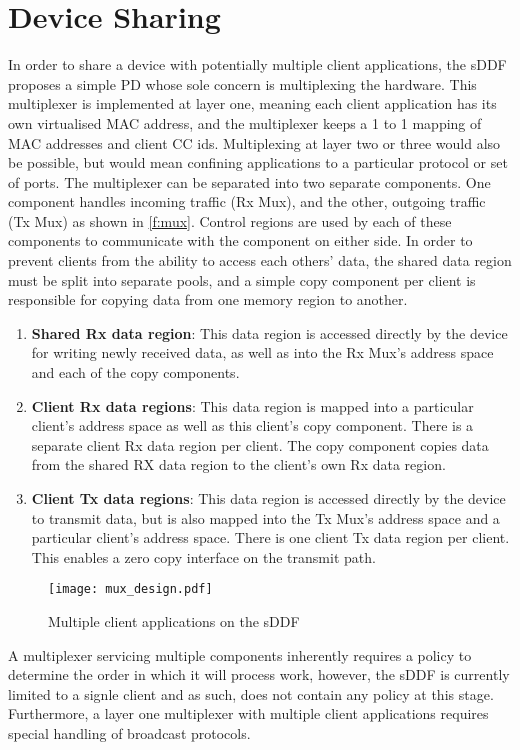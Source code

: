 \section{Device Sharing}\label{s:mux_design}
In order to share a device with potentially multiple client applications, the sDDF proposes a simple PD whose 
sole concern is multiplexing the hardware. This multiplexer is implemented at layer one, meaning each client application has its
own virtualised MAC address, and the multiplexer keeps a 1 to 1 mapping of MAC addresses and client CC ids. Multiplexing at layer two
or three would also be possible, but would mean confining applications to a particular protocol or set of ports. 
The multiplexer
can be separated into two separate components. One component handles incoming traffic (Rx Mux), and the other, outgoing traffic
(Tx Mux) as shown in \autoref{f:mux}. Control regions are used by each of these components to communicate with the component on 
either side.
In order to prevent clients from the ability to access each others' data, the shared data region must be split into
separate pools, and a simple copy component per client is responsible for copying data from one memory region to another.
\begin{enumerate}
\item \textbf{Shared Rx data region}: This data region is accessed directly by the device for writing newly received data, as well
as into the Rx Mux's address space and each of the copy components.
\item \textbf{Client Rx data regions}: This data region is mapped into a particular client's address space as well as this
client's copy component. There is a separate client Rx data region per client. The copy component copies data from the 
shared RX data region to the client's own Rx data region.
\item \textbf{Client Tx data regions}: This data region is accessed directly by the device to transmit data, but is also mapped into
the Tx Mux's address space and a particular client's address space. There is one client Tx data region per client. This
enables a zero copy interface on the transmit path.
\end{enumerate}

\begin{figure}[h]
    \centering
    \texttt{[image: mux\_design.pdf]}
    \caption{Multiple client applications on the sDDF}
    \label{f:mux}
\end{figure}

A multiplexer servicing multiple components inherently requires a policy to determine the order in which it will process work,
however, the sDDF is currently limited to a signle client and as such, does not contain any policy at this stage. Furthermore,
a layer one multiplexer with multiple client applications requires special handling of broadcast protocols. 

